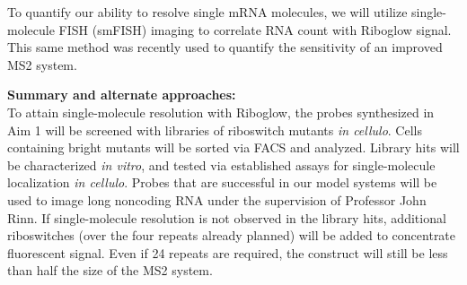 To quantify our ability to resolve single mRNA molecules, we will utilize single-molecule FISH (smFISH) imaging to correlate RNA count with Riboglow signal\cite{MuellerFISHquantautomaticcounting2013}. This same method was recently used to quantify the sensitivity of an improved MS2 system\cite{TutucciimprovedMS2system2018}.




\textbf{Summary and alternate approaches:}\\
To attain single-molecule resolution with Riboglow, the probes synthesized in Aim 1 will be screened with libraries of riboswitch mutants \textit{in cellulo}. Cells containing bright mutants will be sorted via FACS and analyzed. Library hits will be characterized \textit{in vitro}, and tested via established assays for single-molecule localization \textit{in cellulo}. Probes that are successful in our model systems will be used to image long noncoding RNA under the supervision of Professor John Rinn. If single-molecule resolution is not observed in the library hits, additional riboswitches (over the four repeats already planned) will be added to concentrate fluorescent signal. Even if 24 repeats are required, the construct will still be less than half the size of the MS2 system.

